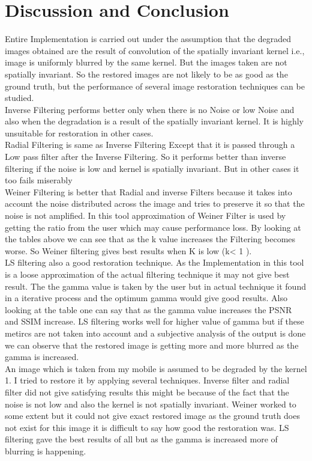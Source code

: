 \documentclass{article}
\begin{document}
\section{Discussion and Conclusion}
Entire Implementation is carried out under the assumption that the degraded images obtained are the result of convolution of the spatially invariant kernel  i.e., image is uniformly blurred by the same kernel. But the images taken are not spatially invariant. So the restored images are not likely to be as good as the ground truth, but the performance of several image restoration techniques can be studied.
\\ Inverse Filtering performs better only when there is no Noise or low Noise and also when the degradation is a result of the spatially invariant kernel. It is highly unsuitable for restoration in other cases.
\\ Radial Filtering is same as Inverse Filtering Except that it is passed through a Low pass filter after the Inverse Filtering. So it performs better than inverse filtering if the noise is low and kernel is spatially invariant. But in other cases it too fails miserably
\\Weiner Filtering is better that Radial and inverse Filters because it takes into account the noise distributed across the image and tries to preserve it so that the noise is not amplified. In this tool approximation of Weiner Filter is used by getting the ratio from the user which may cause performance loss. By looking at the tables above we can see that as the k value increases the Filtering becomes worse. So Weiner filtering gives best results when K is low (k< 1 ).
\\LS filtering also a good restoration technique. As the Implementation in this tool is a loose approximation of the actual filtering technique it may not give best result. The the gamma value is taken by the user but in actual technique it found in a iterative process and the optimum gamma would give good results. Also looking at the table one can say that as the gamma value increases the PSNR and SSIM increase. LS filtering works well for higher value of gamma but if these metircs are not taken into account and a subjective analysis of the output is done we can observe that the restored image is getting more and more blurred as the gamma is increased.
\\An image which is taken from my mobile is assumed to be degraded by the kernel 1. I tried to restore it by applying several techniques. Inverse filter and radial filter did not give satisfying results this might be because of the fact that the noise is not low and also the kernel is not spatially invariant. Weiner worked to some extent but it could not give exact restored image as the ground truth does not exist for this image it is difficult to say how good the restoration was. LS filtering gave the best results of all but as the gamma is increased more of blurring is happening.
\end{document}
